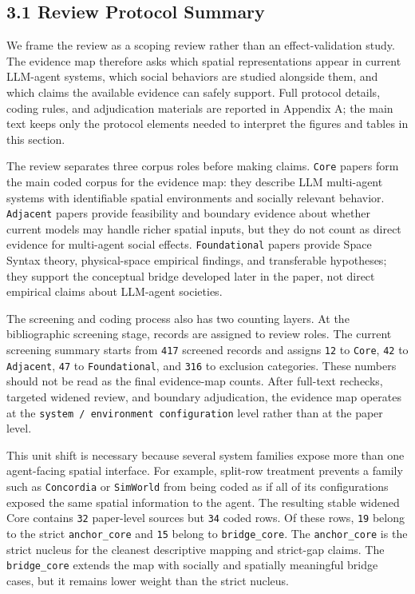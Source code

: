 \documentclass[
  twocolumn]{article}
\begin{document}
\subsection{3.1 Review Protocol Summary}\label{review-protocol-summary}

We frame the review as a scoping review rather than an effect-validation
study. The evidence map therefore asks which spatial representations
appear in current LLM-agent systems, which social behaviors are studied
alongside them, and which claims the available evidence can safely
support. Full protocol details, coding rules, and adjudication materials
are reported in Appendix A; the main text keeps only the protocol
elements needed to interpret the figures and tables in this section.

The review separates three corpus roles before making claims.
\texttt{Core} papers form the main coded corpus for the evidence map:
they describe LLM multi-agent systems with identifiable spatial
environments and socially relevant behavior. \texttt{Adjacent} papers
provide feasibility and boundary evidence about whether current models
may handle richer spatial inputs, but they do not count as direct
evidence for multi-agent social effects. \texttt{Foundational} papers
provide Space Syntax theory, physical-space empirical findings, and
transferable hypotheses; they support the conceptual bridge developed
later in the paper, not direct empirical claims about LLM-agent
societies.

The screening and coding process also has two counting layers. At the
bibliographic screening stage, records are assigned to review roles. The
current screening summary starts from \texttt{417} screened records and
assigns \texttt{12} to \texttt{Core}, \texttt{42} to \texttt{Adjacent},
\texttt{47} to \texttt{Foundational}, and \texttt{316} to exclusion
categories. These numbers should not be read as the final evidence-map
counts. After full-text rechecks, targeted widened review, and boundary
adjudication, the evidence map operates at the
\texttt{system\ /\ environment\ configuration} level rather than at the
paper level.

This unit shift is necessary because several system families expose more
than one agent-facing spatial interface. For example, split-row
treatment prevents a family such as \texttt{Concordia} or
\texttt{SimWorld} from being coded as if all of its configurations
exposed the same spatial information to the agent. The resulting stable
widened Core contains \texttt{32} paper-level sources but \texttt{34}
coded rows. Of these rows, \texttt{19} belong to the strict
\texttt{anchor\_core} and \texttt{15} belong to \texttt{bridge\_core}.
The \texttt{anchor\_core} is the strict nucleus for the cleanest
descriptive mapping and strict-gap claims. The \texttt{bridge\_core}
extends the map with socially and spatially meaningful bridge cases, but
it remains lower weight than the strict nucleus.
\end{document}
